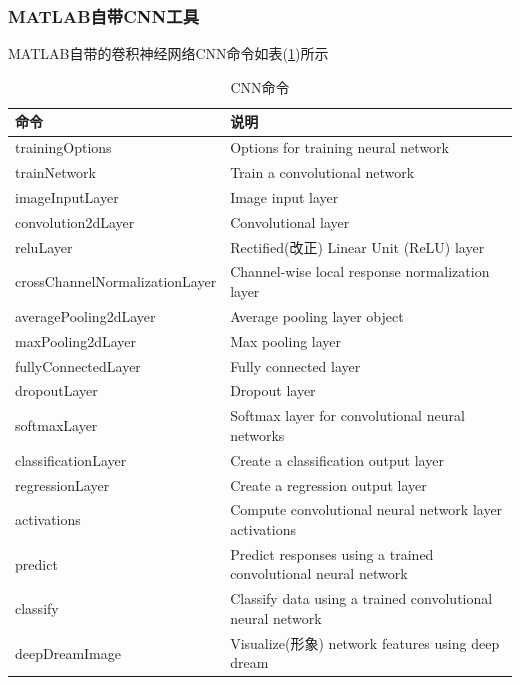         \subsubsection{MATLAB自带CNN工具}
        \par
        MATLAB自带的卷积神经网络CNN命令如表(\ref{tab:CNN命令})所示
        \begin{table}[H]
          \caption{CNN命令}
          \label{tab:CNN命令}
          \centering
          \begin{tabularx}{\textwidth}{l|l}%
          \toprule
          命令  & 说明 \\
          \midrule
          trainingOptions &  Options for training neural network\\
          trainNetwork & Train a convolutional network\\
          imageInputLayer  & Image input layer\\
          convolution2dLayer & Convolutional layer\\
          reluLayer &  Rectified(改正) Linear Unit (ReLU) layer\\
          crossChannelNormalizationLayer&  Channel-wise local response normalization layer\\
          averagePooling2dLayer &  Average pooling layer object\\
          maxPooling2dLayer & Max pooling layer\\
          fullyConnectedLayer  & Fully connected layer\\
          dropoutLayer & Dropout layer\\
          softmaxLayer & Softmax layer for convolutional neural networks\\
          classificationLayer &  Create a classification output layer\\
          regressionLayer &  Create a regression output layer\\
          activations &  Compute convolutional neural network layer activations\\
          predict &  Predict responses using a trained convolutional neural network\\
          classify & Classify data using a trained convolutional neural network\\
          deepDreamImage&  Visualize(形象) network features using deep dream\\

\end{tabularx}
\end{table}

